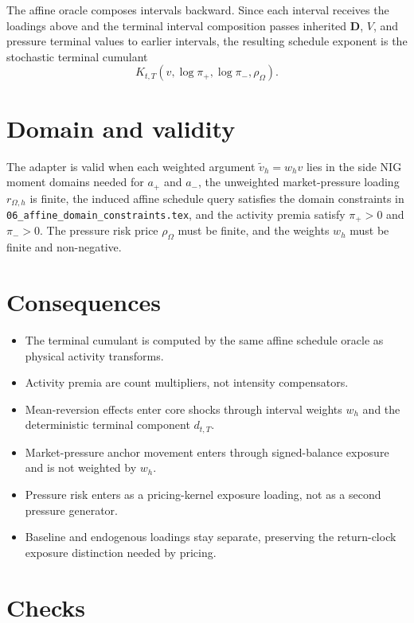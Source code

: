 \documentclass[11pt]{article}
\begin{document}
The affine oracle composes intervals backward.
Since each interval receives the loadings above and the terminal interval
composition passes inherited \(\mathbf D\), \(V\), and pressure terminal values
to earlier intervals, the resulting schedule exponent is the stochastic
terminal cumulant
\[
    K_{t,T}(v,\log\pi_+,\log\pi_-,\rho_\Omega).
\]

\section{Domain and validity}

The adapter is valid when each weighted argument \(\tilde v_h=w_hv\) lies in
the side NIG moment domains needed for \(a_+\) and \(a_-\), the unweighted
market-pressure loading \(r_{\Omega,h}\) is finite, the induced affine
schedule query satisfies the domain constraints in
\texttt{06\_affine\_domain\_constraints.tex}, and the activity premia satisfy
\(\pi_+>0\) and \(\pi_->0\).
The pressure risk price \(\rho_\Omega\) must be finite, and the weights \(w_h\)
must be finite and non-negative.

\section{Consequences}

\begin{itemize}
    \item The terminal cumulant is computed by the same affine schedule oracle as physical activity transforms.
    \item Activity premia are count multipliers, not intensity compensators.
    \item Mean-reversion effects enter core shocks through interval weights \(w_h\) and the deterministic terminal component \(d_{t,T}\).
    \item Market-pressure anchor movement enters through signed-balance exposure and is not weighted by \(w_h\).
    \item Pressure risk enters as a pricing-kernel exposure loading, not as a second pressure generator.
    \item Baseline and endogenous loadings stay separate, preserving the return-clock exposure distinction needed by pricing.
\end{itemize}

\section{Checks}
\end{document}
